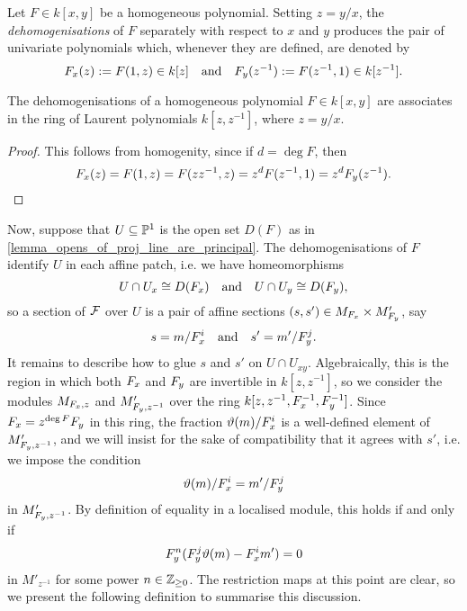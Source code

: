 \begin{definition}
  \label{def_canonical_dehomog}
  Let $F \in k[x, y]$ be a homogeneous polynomial.
  Setting $z = y/x$, the \emph{dehomogenisations} of $F$ separately
  with respect to $x$ and $y$ produces the pair of univariate
  polynomials which, whenever they are defined, are denoted by
  \[
    {{F}}_{{x}}(z) := F(1, z) \in k[z]
    \quad \text{and} \quad
    {{F}}_{{y}}(z^{-1}) := F(z^{-1}, 1) \in k[z^{-1}].
  \]
  \vspace{-24pt}
\end{definition}

\begin{lemma}
  The dehomogenisations of a homogeneous polynomial $F \in k[x, y]$
  are associates in the ring of Laurent polynomials $k[z, z^{-1}]$,
  where $z = y/x$.
\end{lemma}

\begin{proof}
  This follows from homogenity, since if $d = \deg{F}$, then
  \[
    {{F}}_{{x}}(z) = F(1, z) = F(z z^{-1}, z) = z^d F(z^{-1}, 1) =
    z^d {{F}}_{{y}}(z^{-1}). \qedhere
  \]
  \vspace{-24pt}
\end{proof}

Now, suppose that $U \subseteq \mathbb{P}^{{1}}$ is the open set $D(F)$ as in
\cref{lemma_opens_of_proj_line_are_principal}.
The dehomogenisations of $F$ identify $U$ in each affine patch, i.e.
we have homeomorphisms
\[
  U \cap U_x \cong D({{F}}_{{x}})
  \quad \text{and} \quad
  U \cap U_y \cong D({{F}}_{{y}}),
\]
so a section of $\mathcal{F}$ over $U$ is a pair of affine sections $(s,
s') \in M_{{{F}}_{{x}}} \times M'_{{{F}}_{{y}}}$, say
\[
  s = {m}\mathopen/{{{F}}_{{x}}^i}
  \quad \text{and} \quad
  s' = {m'}\mathopen/{{{F}}_{{y}}^j}.
\]
It remains to describe how to glue $s$ and $s'$ on $U \cap U_{xy}$.
Algebraically, this is the region in which both ${{F}}_{{x}}$ and
${{F}}_{{y}}$ are invertible in $k[z, z^{-1}]$, so we consider the
modules $M_{{{F}}_{{x}}, z}$ and $M'_{{{F}}_{{y}}, z^{-1}}$
over the ring $k[z, z^{-1}, {{F}}_{{x}}^{-1}, {{F}}_{{y}}^{-1}]$.
Since ${{F}}_{{x}} = z^{\deg{F}} {{F}}_{{y}}$ in this ring, the
fraction $\vartheta(m)/{{F}}_{{x}}^i$ is a well-defined element of
$M'_{{{F}}_{{y}}, z^{-1}}$, and we will insist for the sake of
compatibility that it agrees with $s'$, i.e. we impose the condition
\[
  {\vartheta(m)}\mathopen/{{{F}}_{{x}}^i} = {m'}\mathopen/{{{F}}_{{y}}^j}
\]
in $M'_{{{F}}_{{y}}, z^{-1}}$.
By definition of equality in a localised module, this holds if and only if
\begin{equation}
  \label{eq_local_section_compatibility}
  {{F}}_{{y}}^n({{F}}_{{y}}^j \vartheta(m) - {{F}}_{{x}}^i m') = 0
\end{equation}
in $M'_{z^{-1}}$ for some power $n \in \mathbb{Z}_{\geq 0}$.
The restriction maps at this point are clear, so we present the
following definition to summarise this discussion.


